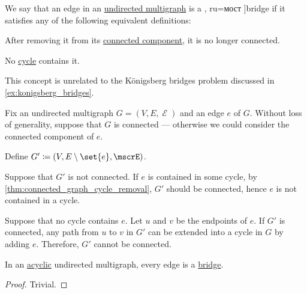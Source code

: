 \begin{definition}\label{def:graph_bridge}
  We say that an edge in an \hyperref[def:hypergraph/multigraph]{undirected multigraph} is a \term[bg=мост (\cite[134]{Мирчев2001Графи}, ru=мост \cite[\S 8.1.2]{Новиков2013ДискретнаяМатематика}]{bridge} if it satisfies any of the following equivalent definitions:
  \begin{thmenum}
     After removing it from its \hyperref[def:graph_connected_component]{connected component}, it is no longer connected.

     No \hyperref[def:graph_cycle]{cycle} contains it.
  \end{thmenum}
\end{definition}
\begin{comments}
  \item This concept is unrelated to the K\"onigsberg bridges problem discussed in \cref{ex:konigsberg_bridges}.
\end{comments}
\begin{defproof}
  Fix an undirected multigraph \( G = (V, E, \mscrE) \) and an edge \( e \) of \( G \). Without loss of generality, suppose that \( G \) is connected --- otherwise we could consider the connected component of \( e \).

  Define \( G' \coloneqq (V, E \setminus \set{ e }, \mscrE) \).

   Suppose that \( G' \) is not connected. If \( e \) is contained in some cycle, by \cref{thm:connected_graph_cycle_removal}, \( G' \) should be connected, hence \( e \) is not contained in a cycle.

   Suppose that no cycle contains \( e \). Let \( u \) and \( v \) be the endpoints of \( e \). If \( G' \) is connected, any path from \( u \) to \( v \) in \( G' \) can be extended into a cycle in \( G \) by adding \( e \). Therefore, \( G' \) cannot be connected.
\end{defproof}

\begin{proposition}\label{thm:acyclic_bridges}
  In an \hyperref[def:acyclic_graph]{acyclic} undirected multigraph, every edge is a \hyperref[def:graph_bridge]{bridge}.
\end{proposition}
\begin{proof}
  Trivial.
\end{proof}

